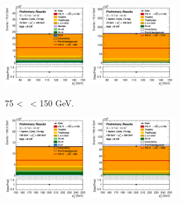 \begin{figure}[h!]
    \centering
    \begin{subfigure}[b]{\textwidth}
        \centering
        \includegraphics[width=0.40\textwidth]{Images/VH/Own_fit/postfit_VHbb/Region_distpTV_BMax150_BMin75_DCRHigh_J2_TTypebb_T2_L1_Y6051_GlobalFit_conditionnal_mu1.png}
        \includegraphics[width=0.40\textwidth]{Images/VH/Own_fit/postfit_VHbb/Region_distpTV_BMax150_BMin75_DCRHigh_J3_TTypebb_T2_L1_Y6051_GlobalFit_conditionnal_mu1.png}
        \caption{75 < \ptv\ < 150 GeV.}
        \label{fig:plots_VHbb_1L_75_CRH}
    \end{subfigure}
    \begin{subfigure}[b]{\textwidth}
        \centering
        \includegraphics[width=0.40\textwidth]{Images/VH/Own_fit/postfit_VHbb/Region_distpTV_BMax250_BMin150_DCRHigh_J2_TTypebb_T2_L1_Y6051_GlobalFit_conditionnal_mu1.png}
        \includegraphics[width=0.40\textwidth]{Images/VH/Own_fit/postfit_VHbb/Region_distpTV_BMax250_BMin150_DCRHigh_J3_TTypebb_T2_L1_Y6051_GlobalFit_conditionnal_mu1.png}

\end{subfigure}
\end{figure}
